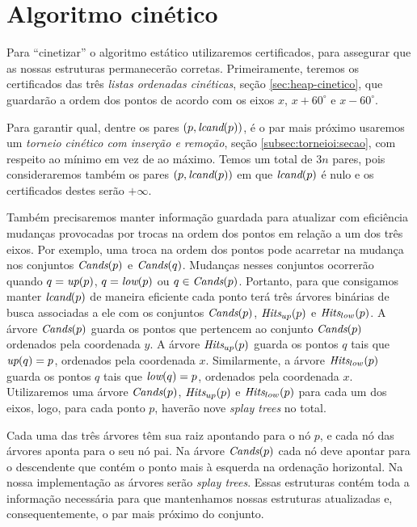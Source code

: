 
\FloatBarrier


\section{Algoritmo cinético}

Para ``cinetizar'' o algoritmo estático utilizaremos certificados,
para assegurar que as nossas estruturas permanecerão corretas.
Primeiramente, teremos os certificados das três \textit{listas
ordenadas cinéticas}, seção \ref{sec:heap-cinetico}, que guardarão a ordem
dos pontos de acordo com os eixos $x$, $x + 60^\circ$ e $x -
60^\circ$.

Para garantir qual, dentre os pares $(p, \textit{lcand}(p))$, é o par mais
próximo usaremos um \textit{torneio cinético com inserção e
remoção}, seção \ref{subsec:torneioi:secao}, com respeito ao mínimo em vez de
ao máximo. Temos um total de $3n$ pares, pois consideraremos também
os pares $(p, \textit{lcand}(p))$ em que $\textit{lcand}(p)$ é nulo e os
certificados destes serão $+\infty$.

Também precisaremos manter informação guardada para atualizar com
eficiência mudanças provocadas por trocas na ordem dos pontos em
relação a um dos três eixos. Por exemplo, uma troca na ordem dos
pontos pode acarretar na mudança nos conjuntos $\textit{Cands}(p)$ e
$\textit{Cands}(q)$. Mudanças nesses conjuntos ocorrerão quando $q =
\textit{up}(p)$, $q = \textit{low}(p)$ ou $q \in \textit{Cands}(p)$. Portanto, para que
consigamos manter $\textit{lcand}(p)$ de maneira eficiente cada ponto terá
três árvores binárias de busca associadas a ele com os conjuntos
$\textit{Cands}(p)$, $\textit{Hits}_{up}(p)$ e $\textit{Hits}_{low}(p)$. A árvore
$\textit{Cands}(p)$ guarda os pontos que pertencem ao conjunto $\textit{Cands}(p)$
ordenados pela coordenada $y$. A árvore $\textit{Hits}_{up}(p)$ guarda os
pontos $q$ tais que $\textit{up}(q) = p$, ordenados pela coordenada $x$.
Similarmente, a árvore $\textit{Hits}_{low}(p)$ guarda os pontos $q$ tais
que $\textit{low}(q) = p$, ordenados pela coordenada $x$. Utilizaremos uma
árvore $\textit{Cands}(p)$, $\textit{Hits}_{up}(p)$ e $\textit{Hits}_{low}(p)$ para cada um
dos eixos, logo, para cada ponto $p$, haverão nove \textit{splay
trees} no total.

Cada uma das três árvores têm sua raiz apontando para o nó $p$, e
cada nó das árvores aponta para o seu nó pai. Na árvore $\textit{Cands}(p)$
cada nó deve apontar para o descendente que contém o ponto mais à
esquerda na ordenação horizontal. Na nossa implementação as árvores
serão \textit{splay trees}. Essas estruturas contém toda a
informação necessária para que mantenhamos nossas estruturas
atualizadas e, consequentemente, o par mais próximo do conjunto.

